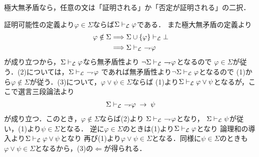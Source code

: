 	極大無矛盾なら，任意の文は「証明される」か「否定が証明される」の二択．
	
	\begin{sketch}
		証明可能性の定義より$\varphi \in \Sigma$ならば$\Sigma \vdash_{{\scriptsize \mathcal{L}}} \varphi$である．
		また極大無矛盾の定義より
		\begin{align}
			\varphi \notin \Sigma 
			&\Longrightarrow \Sigma \cup \{\varphi\} \provable{\mathcal{L}} \bot \\
			&\Longrightarrow \Sigma \provable{\mathcal{L}}\ \negation \varphi
		\end{align}
		が成り立つから，$\Sigma \vdash_{{\scriptsize \mathcal{L}}} \varphi$なら無矛盾性より
		$\neg \Sigma \vdash_{{\scriptsize \mathcal{L}}}\ \rightharpoondown\hspace{-0.25em} \varphi$となるので
		$\varphi \in \Sigma$が従う．(2)については，$\Sigma \vdash_{{\scriptsize \mathcal{L}}}\ \rightharpoondown\hspace{-0.25em} \varphi$
		であれば無矛盾性より$\neg \Sigma \vdash_{{\scriptsize \mathcal{L}}} \varphi$となるので
		(1)から$\varphi \notin \Sigma$が従う．(3)について，$\varphi \vee \psi \in \Sigma$ならば
		(1)より$\Sigma \vdash_{{\scriptsize \mathcal{L}}} \varphi \vee \psi$となるが，ここで選言三段論法より
		\begin{align}
			\Sigma \vdash_{{\scriptsize \mathcal{L}}}\ \rightharpoondown\hspace{-0.25em} \varphi \hspace{0.25em}\rightarrow\hspace{0.25em} \psi
		\end{align}
		が成り立つ．このとき，$\varphi \notin \Sigma$ならば(2)より
		$\Sigma \vdash_{{\scriptsize \mathcal{L}}}\ \rightharpoondown\hspace{-0.25em} \varphi$となり，
		$\Sigma \vdash_{{\scriptsize \mathcal{L}}} \psi$が従い，(1)より$\psi \in \Sigma$となる．
		逆に$\varphi \in \Sigma$のときは(1)より$\Sigma \vdash_{{\scriptsize \mathcal{L}}} \varphi$となり
		論理和の導入より$\Sigma \vdash_{{\scriptsize \mathcal{L}}} \varphi \vee \psi$となり
		再び(1)より$\varphi \vee \psi \in \Sigma$となる．同様に$\psi \in \Sigma$のときも
		$\varphi \vee \psi \in \Sigma$となるから，(3)の$\Longleftarrow$が得られる．
		
	\end{sketch}